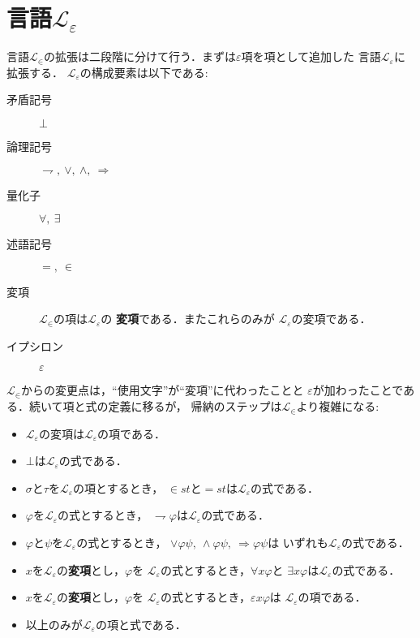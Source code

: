 \section{言語$\mathcal{L}_{\varepsilon}$}
	言語$\mathcal{L}_{\in}$の拡張は二段階に分けて行う．まずは$\varepsilon$項を項として追加した
	言語$\mathcal{L}_{\varepsilon}$に拡張する．
	$\mathcal{L}_{\varepsilon}$の構成要素は以下である:
	
	\begin{description}
		\item[矛盾記号] $\bot$
		\item[論理記号] $\rightharpoondown,\ \vee,\ \wedge,\ \Longrightarrow$
		\item[量化子] $\forall,\ \exists$
		\item[述語記号] $=,\ \in$
		\item[変項] $\mathcal{L}_{\in}$の項は$\mathcal{L}_{\varepsilon}$の
			{\bf 変項}である．またこれらのみが
			$\mathcal{L}_{\varepsilon}$の変項である．
		\item[イプシロン] $\varepsilon$
	\end{description}
	
	$\mathcal{L}_{\in}$からの変更点は，``使用文字''が``変項''に代わったことと
	$\varepsilon$が加わったことである．続いて項と式の定義に移るが，
	帰納のステップは$\mathcal{L}_{\in}$より複雑になる:
	
	\begin{itemize}
		\item $\mathcal{L}_{\varepsilon}$の変項は$\mathcal{L}_{\varepsilon}$の項である．
		\item $\bot$は$\mathcal{L}_{\varepsilon}$の式である．
		\item $\sigma$と$\tau$を$\mathcal{L}_{\varepsilon}$の項とするとき，
			$\in st$と$=st$は$\mathcal{L}_{\varepsilon}$の式である．
		\item $\varphi$を$\mathcal{L}_{\varepsilon}$の式とするとき，
			$\rightharpoondown \varphi$は$\mathcal{L}_{\varepsilon}$の式である．
		\item $\varphi$と$\psi$を$\mathcal{L}_{\varepsilon}$の式とするとき，
			$\vee \varphi \psi,\ \wedge \varphi \psi,\ \Longrightarrow \varphi \psi$は
			いずれも$\mathcal{L}_{\varepsilon}$の式である．
		\item $x$を$\mathcal{L}_{\varepsilon}$の{\bf 変項}とし，$\varphi$を
			$\mathcal{L}_{\varepsilon}$の式とするとき，$\forall x \varphi$と
			$\exists x \varphi$は$\mathcal{L}_{\varepsilon}$の式である．
		\item $x$を$\mathcal{L}_{\varepsilon}$の{\bf 変項}とし，$\varphi$を
			$\mathcal{L}_{\varepsilon}$の式とするとき，$\varepsilon x \varphi$は
			$\mathcal{L}_{\varepsilon}$の項である．
		\item 以上のみが$\mathcal{L}_{\varepsilon}$の項と式である．
	\end{itemize}
	

